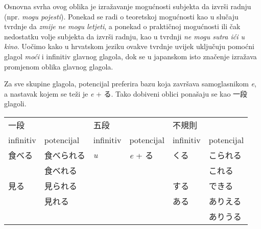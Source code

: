 
\author{Tomislav Mamić}

	
	
	Osnovna svrha ovog oblika je izražavanje mogućnosti subjekta da izvrši radnju (npr. \textit{mogu pojesti}).
	Ponekad se radi o teoretskoj mogućnosti kao u slučaju tvrdnje da \textit{zmije ne mogu letjeti}, a ponekad o praktičnoj mogućnosti ili čak nedostatku volje subjekta da izvrši radnju, kao u tvrdnji \textit{ne mogu sutra ići u kino}.
	Uočimo kako u hrvatskom jeziku ovakve tvrdnje uvijek uključuju pomoćni glagol \textit{moći} i infinitiv glavnog glagola, dok se u japanskom isto značenje izražava promjenom oblika glavnog glagola.
	
	
	Za sve skupine glagola, potencijal preferira bazu koja završava samoglasnikom \textit{e}, a nastavak kojem se teži je \textit{e} + る.
	Tako dobiveni oblici ponašaju se kao 一段 glagoli.
	
	\begin{table}[h]
		\centering
			\begin{tabular}{l l l l l l}\toprule[2pt]
				一段 && 五段 && 不規則 &\\
				infinitiv & potencijal & infinitiv & potencijal & infinitiv & potencijal\\
				\midrule
				食べる & 食べられる & \textit{u} & \textit{e} + る & くる & こられる\\
				& 食べれる & & & & これる\footnotemark[3]\\
				見る & 見られる\footnotemark[2] & & & する & できる\\
				& 見れる & & & ある\footnotemark[4] & ありえる\\
				& & & & & ありうる\\
				\bottomrule[2pt]
			\end{tabular}
	\end{table}

	
